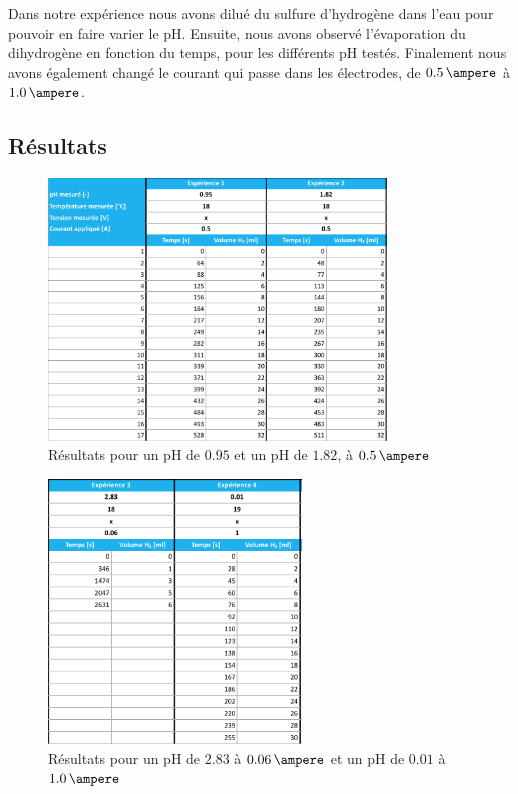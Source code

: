 Dans notre expérience nous avons dilué du sulfure d'hydrogène dans l'eau pour pouvoir en faire varier le pH. Ensuite, nous avons observé l'évaporation du dihydrogène en fonction du temps, pour les différents pH testés. Finalement nous avons également changé le courant qui passe dans les électrodes, de $0.5\,\ampere$ à $1.0\,\ampere$.

\subsection{Résultats}

\begin{figure}
\centering
\includegraphics[width=0.8\textwidth]{img/p2}
\caption{Résultats pour un pH de $0.95$ et un pH de $1.82$, à $0.5\,\ampere$}
\label{fig:elec-results1}
\end{figure}

\begin{figure}
\centering
\includegraphics[width=0.6\textwidth]{img/p3}
\caption{Résultats pour un pH de $2.83$ à $0.06\,\ampere$ et un pH de $0.01$ à $1.0\,\ampere$}
\label{fig:elec-results2}
\end{figure}

